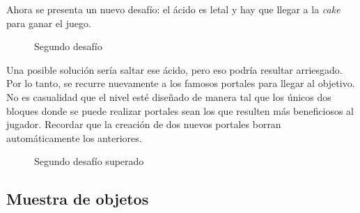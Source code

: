 \documentclass[a4paper]{article}
\begin{document}
Ahora se presenta un nuevo desafío: el ácido es letal y hay que llegar a la \textit{cake} para ganar el juego.

\begin{figure}[!h]
	\caption{Segundo desafío}
	\label{fig:diagrama6}
\end{figure}

Una posible solución sería saltar ese ácido, pero eso podría resultar arriesgado. Por lo tanto, se recurre nuevamente a los famosos portales para llegar al objetivo. No es casualidad que el nivel esté diseñado de manera tal que los únicos dos bloques donde se puede realizar portales sean los que resulten más beneficiosos al jugador. Recordar que la creación de dos nuevos portales borran automáticamente los anteriores.


\begin{figure}[!h]
	\caption{Segundo desafío superado}
	\label{fig:diagrama7}
\end{figure}

\subsection{Muestra de objetos}
\end{document}
